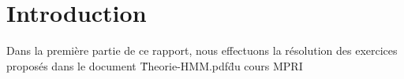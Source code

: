 
\chapter{Introduction} %

\label{Chapitre 1} %


Dans la première partie de ce rapport, nous effectuons la résolution des exercices proposés dans le document \"Theorie-HMM.pdf\" du cours MPRI

























